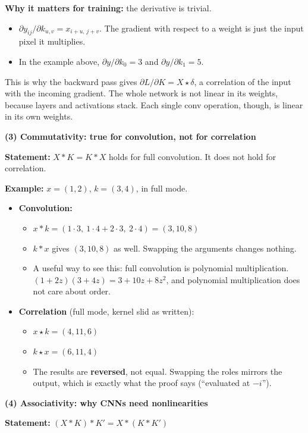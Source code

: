 \textbf{Why it matters for training:} the derivative is trivial.
\begin{itemize}
  \item $\partial y_{ij} / \partial k_{u,v} = x_{i+u,\, j+v}$. The gradient with respect to a weight is just the input pixel it multiplies.
  \item In the example above, $\partial y / \partial k_0 = 3$ and $\partial y / \partial k_1 = 5$.
\end{itemize}
This is why the backward pass gives $\partial L / \partial K = X \star \delta$, a correlation of the input with the incoming gradient. The whole network is not linear in its weights, because layers and activations stack. Each single conv operation, though, is linear in its own weights.

\textbf{(3) Commutativity: true for convolution, not for correlation}

\textbf{Statement:} $X * K = K * X$ holds for full convolution. It does not hold for correlation.

\textbf{Example:} $x = (1, 2)$, $k = (3, 4)$, in full mode.
\begin{itemize}
  \item \textbf{Convolution:}
  \begin{itemize}
    \item $x * k = (1\cdot 3,\ 1\cdot 4 + 2\cdot 3,\ 2\cdot 4) = (3, 10, 8)$
    \item $k * x$ gives $(3, 10, 8)$ as well. Swapping the arguments changes nothing.
    \item A useful way to see this: full convolution is polynomial multiplication. $(1 + 2z)(3 + 4z) = 3 + 10z + 8z^2$, and polynomial multiplication does not care about order.
  \end{itemize}
  \item \textbf{Correlation} (full mode, kernel slid as written):
  \begin{itemize}
    \item $x \star k = (4, 11, 6)$
    \item $k \star x = (6, 11, 4)$
    \item The results are \textbf{reversed}, not equal. Swapping the roles mirrors the output, which is exactly what the proof says (``evaluated at $-i$'').
  \end{itemize}
\end{itemize}

\textbf{(4) Associativity: why CNNs need nonlinearities}

\textbf{Statement:} $(X * K) * K' = X * (K * K')$

